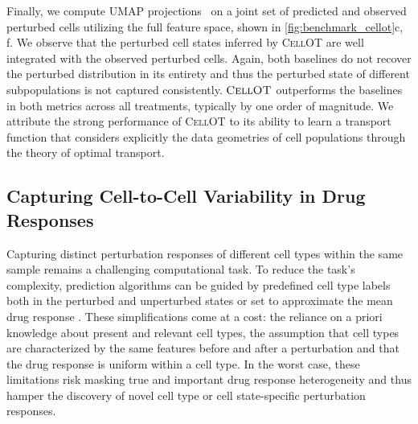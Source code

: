  Finally, we compute UMAP projections~\citep{umap} on a joint set of predicted and observed perturbed cells utilizing the full feature space, shown in \cref{fig:benchmark_cellot}c, f.
We observe that the perturbed cell states inferred by \textsc{CellOT} are well integrated with the observed perturbed cells. Again, both baselines do not recover the perturbed distribution in its entirety %
and thus the perturbed state of different subpopulations is not captured consistently.
$\textsc{CellOT}$ outperforms the baselines in both metrics across all treatments, typically by one order of magnitude.
We attribute the strong performance of \textsc{CellOT} to its ability to learn a transport function that considers explicitly the data geometries of cell populations through the theory of optimal transport.

\subsection{Capturing Cell-to-Cell Variability in Drug Responses}
 Capturing distinct perturbation responses of different cell types within the same sample remains a challenging computational task. To reduce the task's complexity, prediction algorithms can be guided by predefined cell type labels both in the perturbed and unperturbed states \citep{chen2020dissecting} or set to approximate the mean drug response \citep{lotfollahi2019scgen}.  These simplifications come at a cost: the reliance on a priori knowledge about present and relevant cell types, the assumption that cell types are characterized by the same features before and after a perturbation and that the drug response is uniform within a cell type.
In the worst case, these limitations risk masking true and important drug response heterogeneity  and thus hamper the discovery of novel cell type or cell state-specific perturbation responses.


